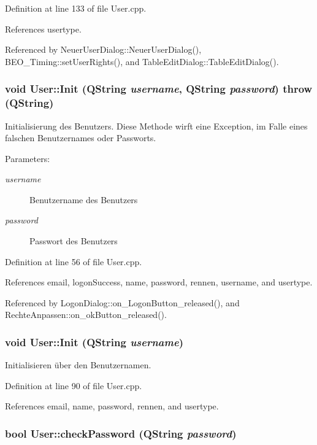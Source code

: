 Definition at line 133 of file User.cpp.

References usertype.

Referenced by NeuerUserDialog::NeuerUserDialog(), BEO\_\-Timing::setUserRights(), and TableEditDialog::TableEditDialog().\hypertarget{class_user_32b6c340b057ae716881248a3ee8f1e2}{
\subsubsection[Init]{\setlength{\rightskip}{0pt plus 5cm}void User::Init (QString {\em username}, \/  QString {\em password})  throw (QString)}}
\label{class_user_32b6c340b057ae716881248a3ee8f1e2}


Initialisierung des Benutzers. Diese Methode wirft eine Exception, im Falle eines falschen Benutzernames oder Passworts. 

\begin{Desc}
\item[Parameters:]
\begin{description}
\item[{\em username}]Benutzername des Benutzers \item[{\em password}]Passwort des Benutzers \end{description}
\end{Desc}


Definition at line 56 of file User.cpp.

References email, logonSuccess, name, password, rennen, username, and usertype.

Referenced by LogonDialog::on\_\-LogonButton\_\-released(), and RechteAnpassen::on\_\-okButton\_\-released().\hypertarget{class_user_b99348b94c4fc390f50113c44111370f}{
\subsubsection[Init]{\setlength{\rightskip}{0pt plus 5cm}void User::Init (QString {\em username})}}
\label{class_user_b99348b94c4fc390f50113c44111370f}


Initialisieren über den Benutzernamen. 



Definition at line 90 of file User.cpp.

References email, name, password, rennen, and usertype.\hypertarget{class_user_f18e23aba10e99668b35c0b46dece9ae}{
\subsubsection[checkPassword]{\setlength{\rightskip}{0pt plus 5cm}bool User::checkPassword (QString {\em password})}}
\label{class_user_f18e23aba10e99668b35c0b46dece9ae}



